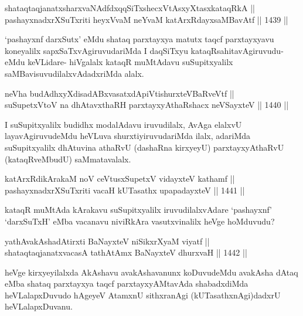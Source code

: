 \begin{shl}
shataqtaqjanatxsharxvaNAdfdxqqSiTxshecxVtAsxyXtasxkataqRkA || \\
pashayxnadxrXSuTxriti heyxVvaM neYvaM katArxRdayxsaMBavAtf ||  1439 || 
\end{shl}

\begin{artha}
`pashayxnf darxSutx' eMdu shataq parxtayxya matutx taqcf parxtayxyavu koneyalilx sapxSaTxvAgiruvudariMda I daqSiTxyu kataqRsahitavAgiruvudu- eMdu keVLidare- hiVgalalx kataqR muMtAdavu suSupitxyalilx saMBavisuvudilalxvAdadxriMda alalx.
\end{artha}

\begin{shl}
neVha budAdhxyXdisadABxvasatxdA\s piVtishurxteVBaRveVtf ||  \\
suSupetxV\s toV na dhAtavxthaRH parxtayxyAthaRshacx neVSayxteV ||  1440 || 
\end{shl}

\begin{artha}
I suSupitxyalilx budidhx modalAdavu iruvudilalx, AvAga elalxvU layavAgiruvudeMdu heVLuva shurxtiyiruvudariMda ilalx, adariMda suSupitxyalilx dhAtuvina athaRvU (dashaRna kirxyeyU) parxtayxyAthaRvU (kataqRveMbudU) saMmatavalalx.
\end{artha}


\begin{shl}
katArxRdikArakaM noV ceVtusxSupetxV vidayxteV kathamf || \\
pashayxnadxrXSuTxriti vacaH kUTasathx upapadayxteV ||  1441 ||  
\end{shl}

\begin{artha}
kataqR muMtAda kArakavu suSupitxyalilx iruvudilalxvAdare `pashayxnf' `darxSuTxH' eMba vacanavu niviRkAra vasutxvinalilx heVge hoMduvudu?
\end{artha}

\begin{shl}
yathA\s vakAshadAtirxti BaNayxteV niSikxrXyaM viyatf ||  \\
shataqtaqjanatxvacasA tathA\s \s tAmx BaNayxteV dhurxvaH ||  1442 ||  
\end{shl}

\begin{artha}
heVge kirxyeyilalxda AkAshavu avakAshavanunx koDuvudeMdu avakAsha dAtaq eMba shataq parxtayxya taqcf parxtayxyAMtavAda shabadxdiMda heVLalapxDuvudo hAgeyeV AtamxnU sithxranAgi (kUTasathxnAgi)dadxrU heVLalapxDuvanu.
\end{artha}

